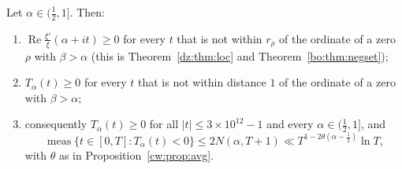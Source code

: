 \begin{theorem}[proved]\label{cw:thm:local2}
Let $\alpha\in(\frac12,1]$. Then:
\begin{enumerate}
\item $\operatorname{Re}\frac{\xi'}\xi(\alpha+it)\ge0$ for every $t$ that is not within $r_\rho$ of the ordinate of a zero $\rho$ with $\beta>\alpha$ (this is Theorem~\ref{dz:thm:loc} and Theorem~\ref{bo:thm:negset});
\item $T_\alpha(t)\ge0$ for every $t$ that is not within distance $1$ of the ordinate of a zero with $\beta>\alpha$;
\item consequently $T_\alpha(t)\ge0$ for all $|t|\le3\times10^{12}-1$ and every $\alpha\in(\frac12,1]$, and
\[
\operatorname{meas}\{t\in[0,T]:T_\alpha(t)<0\}\le2N(\alpha,T+1)\ll T^{1-2\theta(\alpha-\frac12)}\ln T,
\]
with $\theta$ as in Proposition~\ref{cw:prop:avg}.
\end{enumerate}
\end{theorem}

